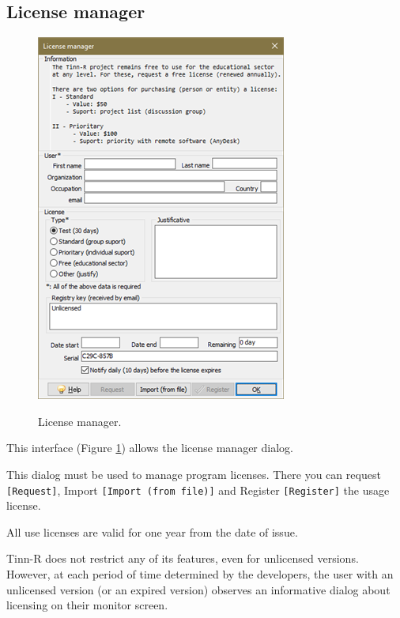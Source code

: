 \hypertarget{dlg_license_manager}{}
\subsection{License manager}

\begin{figure}[H]
  \begin{center}
    \includegraphics[scale=0.8]{./res/dlg_license_manager.png}\\
  \end{center}
  \caption{License manager.}
  \label{fig:dlg_license_manager}
\end{figure}

This interface
(Figure \ref{fig:dlg_license_manager})
allows the license manager dialog.

This dialog must be used to manage program licenses. There you can request \texttt{[Request]},
Import \texttt{[Import (from file)]} and Register \texttt{[Register]} the usage license.

All use licenses are valid for one year from the date of issue.

Tinn-R does not restrict any of its features, even for unlicensed versions. However, at each period of
time determined by the developers, the user with an unlicensed version (or an expired version) observes
an informative dialog about licensing on their monitor screen.


